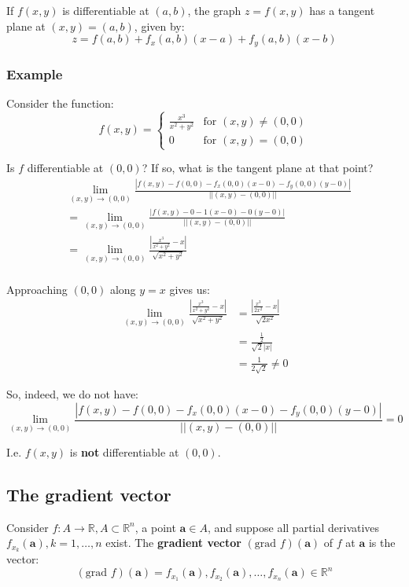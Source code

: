 \documentclass[11pt]{article}
\begin{document}
If \(f(x, y)\) is differentiable at \((a, b)\), the graph \(z = f(x, y)\) has a tangent plane at \((x, y) = (a, b)\), given by:
\[z = f(a, b) + f_x (a, b) (x - a) + f_y (a, b) (x - b)\]
\subsubsection{Example}
\label{sec:org6c666e7}
Consider the function:
\[
f(x, y) = \begin{cases}
\frac{x^3}{x^2 + y^2} & \text{for } (x, y) \ne (0, 0) \\
0 & \text{for } (x, y) = (0, 0)
\end{cases}
\]

Is \(f\) differentiable at \((0, 0)\)? If so, what is the tangent plane at that point?
\begin{align*}
&\lim_{(x, y) \rightarrow (0, 0)} \frac{|f(x, y) - f(0, 0) - f_x(0, 0) (x - 0) - f_y(0, 0) (y - 0)|}{||(x, y) - (0, 0)||} \\
&= \lim_{(x, y) \rightarrow (0, 0)} \frac{|f(x, y) - 0 - 1 (x - 0) - 0 (y - 0)|}{||(x, y) - (0, 0)||} \\
&= \lim_{(x, y) \rightarrow (0, 0)} \frac{\left|\frac{x^3}{x^2 + y^2} - x \right|}{\sqrt{x^2 + y^2}} \\
\end{align*}

Approaching \((0, 0)\) along \(y = x\) gives us:
\begin{align*}
\lim_{(x, y) \rightarrow (0, 0)} \frac{\left|\frac{x^3}{x^2 + y^2} - x \right|}{\sqrt{x^2 + y^2}} &= \frac{\left| \frac{x^3}{2x^2} - x \right|}{\sqrt{2x^2}} \\
&= \frac{\frac{1}{2}}{\sqrt{2} |x|} \\
&= \frac{1}{2\sqrt{2}} \neq 0
\end{align*}

So, indeed, we do not have:
\[\lim_{(x, y) \rightarrow (0, 0)} \frac{|f(x, y) - f(0, 0) - f_x(0, 0) (x - 0) - f_y(0, 0) (y - 0)|}{||(x, y) - (0, 0)||} = 0\]

I.e. \(f(x ,y)\) is \textbf{not} differentiable at \((0, 0)\).
\subsection{The gradient vector}
\label{sec:org810efce}
Consider \(f : A \rightarrow \mathbb{R}, A \subset \mathbb{R}^n\), a point \(\boldsymbol{a} \in A\), and suppose all partial derivatives \(f_{x_k}(\boldsymbol{a}), k = 1, \ldots, n\) exist. The \textbf{gradient vector} \((\text{grad } f)(\boldsymbol{a})\) of \(f\) at \(\boldsymbol{a}\) is the vector:
\[(\text{grad } f)(\boldsymbol{a}) = f_{x_1}(\boldsymbol{a}), f_{x_2}(\boldsymbol{a}), \ldots, f_{x_n}(\boldsymbol{a}) \in \mathbb{R}^n\]
\end{document}
